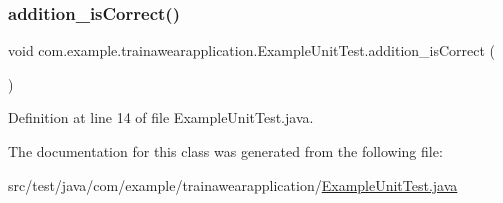 \subsubsection{\texorpdfstring{addition\_isCorrect()}{addition\_isCorrect()}}
{\footnotesize\ttfamily void com.\+example.\+trainawearapplication.\+Example\+Unit\+Test.\+addition\+\_\+is\+Correct (\begin{DoxyParamCaption}{ }\end{DoxyParamCaption})}



Definition at line 14 of file Example\+Unit\+Test.\+java.


\begin{DoxyCode}{0}

\end{DoxyCode}


The documentation for this class was generated from the following file\+:\begin{DoxyCompactItemize}
\item 
src/test/java/com/example/trainawearapplication/\mbox{\hyperlink{_example_unit_test_8java}{Example\+Unit\+Test.\+java}}\end{DoxyCompactItemize}
